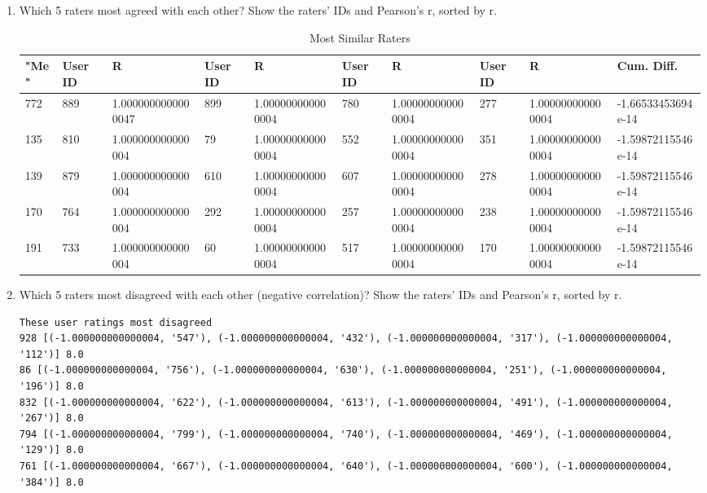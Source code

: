 \documentclass[letterpaper,11pt]{report}
\begin{document}
\begin{savenotes}
\begin{enumerate}
\item Which 5 raters most agreed with each other? Show the raters' IDs and Pearson's r, sorted by r.

\begin{table}[htbp]
\centering
    \begin{tabular}{|l|l|l|l|l|l|l|l|l|l|}
    \hline
    "Me" & User ID & R                  & User ID & R                 & User ID & R                 & User ID & R                 & Cum. Diff.         \\ \hline
    772  & 889     & 1.0000000000000047 & 899     & 1.000000000000004 & 780     & 1.000000000000004 & 277     & 1.000000000000004 & -1.66533453694e-14 \\ \hline
    135  & 810     & 1.000000000000004  & 79      & 1.000000000000004 & 552     & 1.000000000000004 & 351     & 1.000000000000004 & -1.59872115546e-14 \\ \hline
    139  & 879     & 1.000000000000004  & 610     & 1.000000000000004 & 607     & 1.000000000000004 & 278     & 1.000000000000004 & -1.59872115546e-14 \\ \hline
    170  & 764     & 1.000000000000004  & 292     & 1.000000000000004 & 257     & 1.000000000000004 & 238     & 1.000000000000004 & -1.59872115546e-14 \\ \hline
    191  & 733     & 1.000000000000004  & 60      & 1.000000000000004 & 517     & 1.000000000000004 & 170     & 1.000000000000004 & -1.59872115546e-14 \\ \hline
    \end{tabular}
    \caption {Most Similar Raters}
\end{table}

\item Which 5 raters most disagreed with each other (negative correlation)? Show the raters' IDs and Pearson's r, sorted by r.
\begin{verbatim}
These user ratings most disagreed
928 [(-1.000000000000004, '547'), (-1.000000000000004, '432'), (-1.000000000000004, '317'), (-1.000000000000004, '112')] 8.0
86 [(-1.000000000000004, '756'), (-1.000000000000004, '630'), (-1.000000000000004, '251'), (-1.000000000000004, '196')] 8.0
832 [(-1.000000000000004, '622'), (-1.000000000000004, '613'), (-1.000000000000004, '491'), (-1.000000000000004, '267')] 8.0
794 [(-1.000000000000004, '799'), (-1.000000000000004, '740'), (-1.000000000000004, '469'), (-1.000000000000004, '129')] 8.0
761 [(-1.000000000000004, '667'), (-1.000000000000004, '640'), (-1.000000000000004, '600'), (-1.000000000000004, '384')] 8.0
\end{verbatim}


\end{enumerate}
\end{savenotes}
\end{document}
